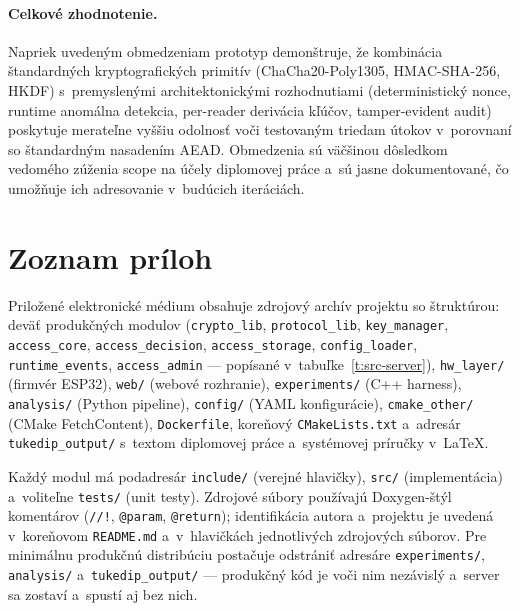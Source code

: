 \documentclass[a4paper]{feidipsp}
\begin{document}
\paragraph{Celkové zhodnotenie.}
Napriek uvedeným obmedzeniam prototyp demonštruje, že kombinácia štandardných kryptografických primitív (ChaCha20-Poly1305\cite{RFC8439}, HMAC-SHA-256\cite{FIPS1981}, HKDF\cite{RFC5869}) s~premyslenými architektonickými rozhodnutiami (deterministický nonce, runtime anomálna detekcia, per-reader derivácia kľúčov, tamper-evident audit) poskytuje merateľne vyššiu odolnosť voči testovaným triedam útokov v~porovnaní so štandardným nasadením AEAD\@. Obmedzenia sú väčšinou dôsledkom vedomého zúženia scope na účely diplomovej práce a~sú jasne dokumentované, čo umožňuje ich adresovanie v~budúcich iteráciách.



\section{Zoznam príloh}

Priložené elektronické médium obsahuje zdrojový archív projektu so štruktúrou: deväť produkčných modulov (\texttt{crypto\_lib}, \texttt{protocol\_lib}, \texttt{key\_manager}, \texttt{access\_core}, \texttt{access\_decision}, \texttt{access\_storage}, \texttt{config\_loader}, \texttt{runtime\_events}, \texttt{access\_admin} --- popísané v~tabuľke~\ref{t:src-server}), \texttt{hw\_layer/} (firmvér ESP32), \texttt{web/} (webové rozhranie), \texttt{experiments/} (C++ harness), \texttt{analysis/} (Python pipeline), \texttt{config/} (YAML konfigurácie), \texttt{cmake\_other/} (CMake FetchContent), \texttt{Dockerfile}, koreňový \texttt{CMakeLists.txt} a~adresár \texttt{tukedip\_output/} s~textom diplomovej práce a~systémovej príručky v~\LaTeX{}.

Každý modul má podadresár \texttt{include/} (verejné hlavičky), \texttt{src/} (implementácia) a~voliteľne \texttt{tests/} (unit testy). Zdrojové súbory používajú Doxygen-štýl komentárov (\texttt{//!}, \texttt{@param}, \texttt{@return}); identifikácia autora a~projektu je uvedená v~koreňovom \texttt{README.md} a~v~hlavičkách jednotlivých zdrojových súborov. Pre minimálnu produkčnú distribúciu postačuje odstrániť adresáre \texttt{experiments/}, \texttt{analysis/} a~\texttt{tukedip\_output/} --- produkčný kód je voči nim nezávislý a~server sa zostaví a~spustí aj bez nich.
\end{document}

